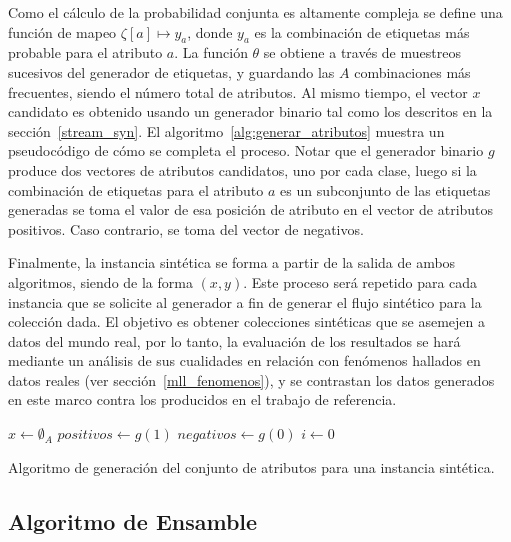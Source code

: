 Como el cálculo de la probabilidad conjunta es altamente compleja se define una
función de mapeo $\zeta[a] \mapsto y_{a}$, donde $y_{a}$ es la combinación de
etiquetas más probable para el atributo $a$.  La función $\theta$ se obtiene a
través de muestreos sucesivos del generador de etiquetas, y guardando las $A$
combinaciones más frecuentes, siendo el número total de atributos. Al mismo
tiempo, el vector $x$ candidato es obtenido usando un generador binario tal como
los descritos en la sección~\ref{stream_syn}. El
algoritmo~\ref{alg:generar_atributos} muestra un pseudocódigo de cómo se
completa el proceso. Notar que el generador binario $g$ produce dos vectores de
atributos candidatos, uno por cada clase, luego si la combinación de etiquetas
para el atributo $a$ es un subconjunto de las etiquetas generadas se toma el
valor de esa posición de atributo en el vector de atributos positivos. Caso
contrario, se toma del vector de negativos.

Finalmente, la instancia sintética se forma a partir de la salida de ambos
algoritmos, siendo de la forma $(x, y)$. Este proceso será repetido para cada
instancia que se solicite al generador a fin de generar el flujo sintético para
la colección dada. El objetivo es obtener colecciones sintéticas que se asemejen
a datos del mundo real, por lo tanto, la evaluación de los resultados se hará
mediante un análisis de sus cualidades en relación con fenómenos hallados en
datos reales (ver sección~\ref{mll_fenomenos}), y se contrastan los datos
generados en este marco contra los producidos en el trabajo de referencia.

\begin{center}
	\begin{algorithm}[H]
		\label{alg:generar_atributos}
		\SetAlgoLined
		\DontPrintSemicolon
		$x \gets \emptyset_{A}$\;
		$positivos \gets g(1)$ \;
		$negativos \gets g(0)$ \;
		$i \gets 0$ \;
		\caption{Algoritmo de generación del conjunto de atributos para una
			instancia sintética.}
	\end{algorithm}
\end{center}

\subsection{Algoritmo de Ensamble}
\label{tecnica_algoritmo_ensamble}

